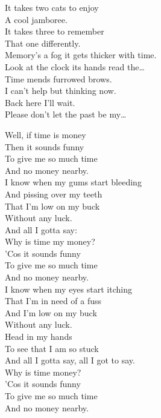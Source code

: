 It takes two cats to enjoy \\
A cool jamboree. \\
It takes three to remember \\
That one differently. \\
Memory's a fog it gets thicker with time. \\
Look at the clock its hands read the… \\

Time mends furrowed brows. \\
I can't help but thinking now. \\
Back here I'll wait. \\
Please don't let the past be my… \\




Well, if time is money \\
Then it sounds funny \\
To give me so much time \\
And no money nearby. \\

I know when my gums start bleeding \\
And pissing over my teeth \\
That I'm low on my buck \\
Without any luck. \\
And all I gotta say: \\

Why is time my money? \\
'Cos it sounds funny \\
To give me so much time \\
And no money nearby. \\

I know when my eyes start itching \\
That I'm in need of a fuss \\
And I'm low on my buck \\
Without any luck. \\
Head in my hands \\
To see that I am so stuck \\
And all I gotta say, all I got to say. \\

Why is time money? \\
'Cos it sounds funny \\
To give me so much time \\
And no money nearby. \\

